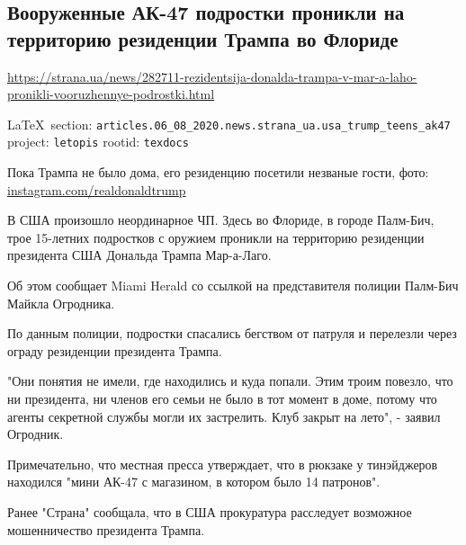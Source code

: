  
 
\subsection{Вооруженные АК-47 подростки проникли на территорию резиденции Трампа во Флориде}
\label{sec:articles.06_08_2020.news.strana_ua.usa_trump_teens_ak47}
\url{https://strana.ua/news/282711-rezidentsija-donalda-trampa-v-mar-a-laho-pronikli-vooruzhennye-podrostki.html}
  
\vspace{0.5cm}
 {\ifDEBUG\small\LaTeX~section: \verb|articles.06_08_2020.news.strana_ua.usa_trump_teens_ak47| project: \verb|letopis| rootid: \verb|texdocs|	\fi}
\vspace{0.5cm}


Пока Трампа не было дома, его резиденцию посетили незваные гости, фото:
\url{instagram.com/realdonaldtrump} 

В США произошло неординарное ЧП. Здесь во Флориде, в городе Палм-Бич, трое
15-летних подростков с оружием проникли на территорию резиденции президента США
Дональда Трампа Мар-а-Лаго.

Об этом сообщает Miami Herald со ссылкой на представителя полиции Палм-Бич
Майкла Огродника.

По данным полиции, подростки спасались бегством от патруля и перелезли через
ограду резиденции президента Трампа.

"Они понятия не имели, где находились и куда попали. Этим троим повезло, что ни
президента, ни членов его семьи не было в тот момент в доме, потому что агенты
секретной службы могли их застрелить. Клуб закрыт на лето", - заявил Огродник.
 
Примечательно, что местная пресса утверждает, что в рюкзаке у тинэйджеров
находился "мини АК-47 с магазином, в котором было 14 патронов".

Ранее "Страна" сообщала, что в США прокуратура расследует возможное
мошенничество президента Трампа.
